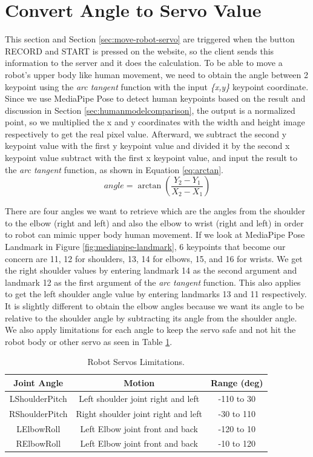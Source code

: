 \section{Convert Angle to Servo Value}
\label{sec:convert-angle-to-servo-value}

This section and Section \ref{sec:move-robot-servo} are triggered when the button RECORD and START is pressed on the website, so the client sends this information to the server and it does the calculation. 
To be able to move a robot's upper body like human movement, we need to obtain the angle between 2 keypoint using the \emph{arc tangent} function with the input \emph{\{x,y\}} keypoint coordinate.
Since we use MediaPipe Pose to detect human keypoints based on the result and discussion in Section \ref{sec:humanmodelcomparison}, the output is a normalized point, so we multiplied the x and y coordinates with the width and height image respectively to get the real pixel value.
Afterward, we subtract the second y keypoint value with the first y keypoint value and divided it by the second x keypoint value subtract with the first x keypoint value, and input the result to the \emph{arc tangent} function, as shown in Equation \ref{eq:arctan}.
\begin{equation}
  \label{eq:arctan}
  angle = \arctan \left(\frac{Y_2 - Y_1}{X_2 - X_1}\right)
\end{equation}

There are four angles we want to retrieve which are the angles from the shoulder to the elbow (right and left) and also the elbow to wrist (right and left) in order to robot can mimic upper body human movement.
If we look at MediaPipe Pose Landmark in Figure \ref{fig:mediapipe-landmark}, 6 keypoints that become our concern are 11, 12 for shoulders, 13, 14 for elbows, 15, and 16 for wrists. 
We get the right shoulder values by entering landmark 14 as the second argument and landmark 12 as the first argument of the \emph{arc tangent} function. This also applies to get the left shoulder angle value by entering landmarks 13 and 11 respectively. 
It is slightly different to obtain the elbow angles because we want its angle to be relative to the shoulder angle by subtracting its angle from the shoulder angle. We also apply limitations for each angle to keep the servo safe and not hit the robot body or other servo as seen in Table \ref{tb:robot-servos}.

\begin{longtable}{ccc}
  \caption{Robot Servos Limitations.}
  \label{tb:robot-servos}\\
  \hline
  \rowcolor[HTML]{C0C0C0}
  \textbf{Joint Angle} & \textbf{Motion} & \textbf{Range (deg)} \\
  \hline
  LShoulderPitch       & Left shoulder joint right and left    & -110 to 30  \\
  RShoulderPitch       & Right shoulder joint right and left   & -30 to 110 \\
  LElbowRoll           & Left Elbow joint front and back       & -120 to 10  \\
  RElbowRoll           & Left Elbow joint front and back       & -10 to 120  \\
  \hline
\end{longtable}


